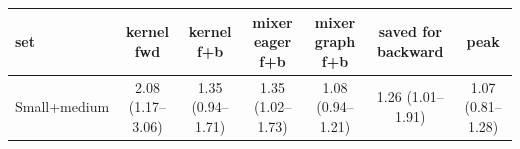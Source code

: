 \begin{tabular}{l c c c c c c }
\toprule
set & kernel fwd & kernel f+b & mixer eager f+b & mixer graph f+b & saved for backward & peak \\
\midrule
Small+medium & 2.08 (1.17--3.06) & 1.35 (0.94--1.71) & 1.35 (1.02--1.73) & 1.08 (0.94--1.21) & 1.26 (1.01--1.91) & 1.07 (0.81--1.28) \\
\bottomrule
\end{tabular}
